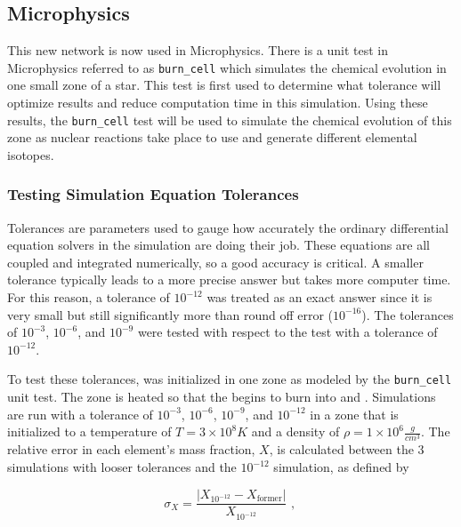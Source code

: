 \documentclass[preprint]{aastex62}
\begin{document}
  \subsection{Microphysics}
  
    This new network is now used in Microphysics. There is a unit test in Microphysics referred to as {\tt burn\_cell} which simulates the chemical evolution in one small zone of a star. This test is first used to determine what tolerance will optimize results and reduce computation time in this simulation. Using these results, the {\tt burn\_cell} test will be used to simulate the chemical evolution of this zone as nuclear reactions take place to use and generate different elemental isotopes. 
  
    \subsubsection{Testing Simulation Equation Tolerances}
  
      Tolerances are parameters used to gauge how accurately the ordinary differential equation solvers in the simulation are doing their job. These equations are all coupled and integrated numerically, so a good accuracy is critical. A smaller tolerance typically leads to a more precise answer but takes more computer time. For this reason, a tolerance of $10^{-12}$ was treated as an exact answer since it is very small but still significantly more than round off error ($10^{-16}$). The tolerances of $10^{-3}$, $10^{-6}$, and $10^{-9}$ were tested with respect to the test with a tolerance of $10^{-12}$. 
     
      To test these tolerances,  was initialized in one zone as modeled by the {\tt burn\_cell} unit test. The zone is heated so that the  begins to burn into  and . Simulations are run with a tolerance of $10^{-3}$, $10^{-6}$, $10^{-9}$, and $10^{-12}$ in a zone that is initialized to a temperature of $T = 3 \times 10^8 K$ and a density of $\rho = 1 \times 10^6 \frac{g}{cm^3}$. The relative error in each element's mass fraction, $X$, is calculated between the 3 simulations with looser tolerances and the $10^{-12}$ simulation, as defined by 
    
      \begin{equation}
        \sigma_X = \frac{\lvert X_{10^{-12}} - X_{\text{former}} \rvert }{X_{10^{-12}}} \text{    , }
        \label{eq:relativeerror}
      \end{equation}
    
\end{document}
